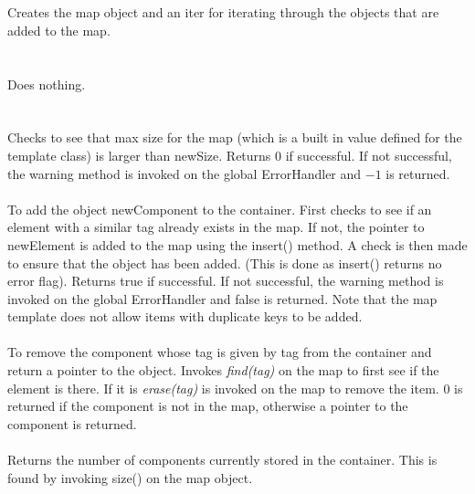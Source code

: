  \\
 \\
Creates the map object and an iter for iterating through the objects
that are added to the map. \\

 \\
 \\ 
Does nothing.\\

 \\
\\
Checks to see that max size for the map (which is a built in value
defined for the template class) is larger than \p newSize. Returns
$0$ if successful. If not successful, the warning method is invoked
on the global ErrorHandler and $-1$ is returned.\\

\\
To add the object \p newComponent to the container. First checks to
see if an element with a similar tag already exists in the map. If
not, the pointer to \p newElement is added to the map using the
insert() method. A check is then made to ensure that the object
has been added. (This is done as insert() returns no error flag).
Returns \p true if successful. If not successful, the warning
method is invoked on the global ErrorHandler and \p false is
returned. Note that the map template does not allow items with
duplicate keys to be added.\\ 
 
\\
To remove the component whose tag is given by \p tag from the
container and return a pointer to the object. Invokes {\em find(tag)}
on the map to first see if the element is there. If it is {\em
erase(tag)} is invoked on the map to remove the item. $0$ is returned
if the component is not in the map, otherwise a pointer to the component
is returned.\\

\\
Returns the number of components currently stored in the
container. This is found by invoking size() on the map object.\\

